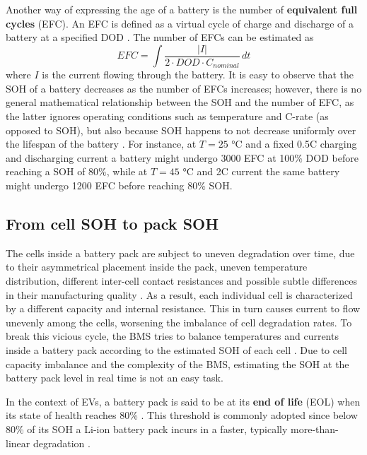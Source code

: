 Another way of expressing the age of a battery is the number of \textbf{equivalent full cycles} (EFC). An EFC is defined as a virtual cycle of charge and discharge of a battery at a specified DOD \cite{efc}. The number of EFCs can be estimated as
\begin{equation}
\label{eq:efc}
EFC = \int \frac{|I|}{2 \cdot DOD \cdot C_{nominal}} \, dt
\end{equation}
where $I$ is the current flowing through the battery. It is easy to observe that the SOH of a battery decreases as the number of EFCs increases; however, there is no general mathematical relationship between the SOH and the number of EFC, as the latter ignores operating conditions such as temperature and C-rate (as opposed to SOH), but also because SOH happens to not decrease uniformly over the lifespan of the battery \cite{efc,efc2}. For instance, at $T=25$ °C and a fixed 0.5C charging and discharging current a battery might undergo 3000 EFC at 100\% DOD before reaching a SOH of 80\%, while at $T=45$ °C and 2C current the same battery might undergo 1200 EFC before reaching 80\% SOH.

\subsection{From cell SOH to pack SOH}
\label{sec:cell_soh2pack_soh}
The cells inside a battery pack are subject to uneven degradation over time, due to their asymmetrical placement inside the pack, uneven temperature distribution, different inter-cell contact resistances and possible subtle differences in their manufacturing quality \cite{uneven_soh}. As a result, each individual cell is characterized by a different capacity and internal resistance. This in turn causes current to flow unevenly among the cells, worsening the imbalance of cell degradation rates. To break this vicious cycle, the BMS tries to balance temperatures and currents inside a battery pack according to the estimated SOH of each cell \cite{bms_balancing1,bms_balancing2}. Due to cell capacity imbalance and the complexity of the BMS, estimating the SOH at the battery pack level in real time is not an easy task.

In the context of EVs, a battery pack is said to be at its \textbf{end of life} (EOL) when its state of health reaches 80\% \cite{eol_def}. This threshold is commonly adopted since below 80\% of its SOH a Li-ion battery pack incurs in a faster, typically more-than-linear degradation \cite{soh_after_eol}.


